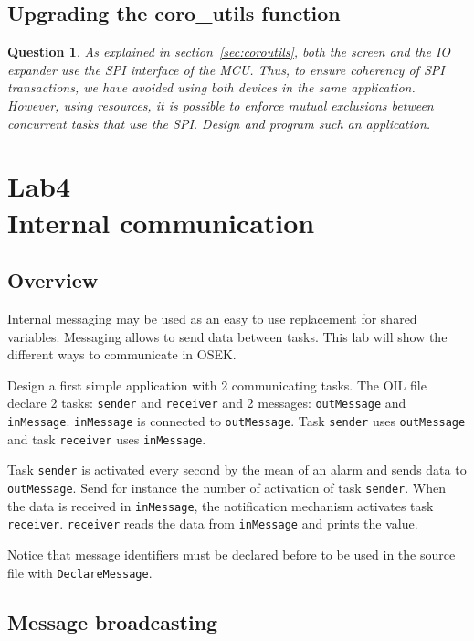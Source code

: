 \documentclass[11pt]{report}
\newtheorem{ex}{Question}
\begin{document}
\section{Upgrading the coro\_utils function}

\begin{ex}
    As explained in section~\ref{sec:coroutils}, both the screen and the IO
    expander use the SPI interface of the MCU. Thus, to ensure coherency of SPI
    transactions, we have avoided using both devices in the same application.
    However, using resources, it is possible to enforce mutual exclusions
    between concurrent tasks that use the SPI.
    Design and program such an application.
\end{ex}

\chapter{Lab4\\Internal communication}

\section{Overview}

Internal messaging may be used as an easy to use replacement for shared variables. Messaging allows to send data between tasks. This lab will show the different ways to communicate in OSEK.

Design a first simple application with 2 communicating tasks.
The OIL file declare 2 tasks: \texttt{sender} and \texttt{receiver} and 2 messages: \texttt{outMessage} and \texttt{inMessage}. \texttt{inMessage} is connected to \texttt{outMessage}. Task \texttt{sender} uses \texttt{outMessage} and task \texttt{receiver} uses \texttt{inMessage}.

Task \texttt{sender} is activated every second by the mean of an alarm and sends data to \texttt{outMessage}.
Send for instance the number of activation of task \texttt{sender}.
When the data is received in \texttt{inMessage}, the notification mechanism activates task \texttt{receiver}.
\texttt{receiver} reads the data from \texttt{inMessage} and prints the value.

Notice that message identifiers must be declared before to be used in the source file with \texttt{DeclareMessage}.

\section{Message broadcasting}
\end{document}
